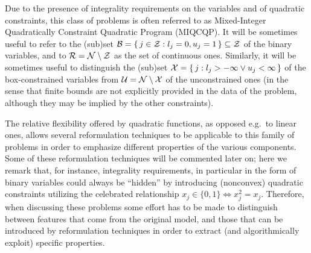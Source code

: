 %
Due to the presence of integrality requirements on the variables and of quadratic constraints, this class of problems is often referred to as Mixed-Integer Quadratically Constraint Quadratic Program (MIQCQP). It will be sometimes useful to refer to the (sub)set $\mathcal{B} =  \{ \, j \in \mathcal{Z} : l_j = 0 , u_j = 1 \, \} \subseteq \mathcal{Z}$ of the binary variables, and to $\mathcal{R} = \mathcal{N} \setminus \mathcal{Z}$ as the set of continuous ones. Similarly, it will be sometimes useful to distinguish the (sub)set $\mathcal{X} = \{ \, j : l_j > -\infty \lor u_j < \infty \, \}$ of the box-constrained variables from $\mathcal{U} = \mathcal{N} \setminus \mathcal{X}$ of the unconstrained ones (in the sense that finite bounds are not explicitly provided in the data of the problem, although they may be implied by the other constraints).

The relative flexibility offered by quadratic functions, as opposed e.g.~to linear ones, allows several reformulation techniques to be applicable to this family of problems in order to emphasize different properties of the various components. Some of these reformulation techniques will be commented later on; here we remark that, for instance, integrality requirements, in particular in the form of binary variables could always be ``hidden'' by introducing (nonconvex) quadratic constraints utilizing the celebrated relationship $x_j \in \{0, 1\} \iff x_j^2 = x_j$. Therefore, when discussing these problems some effort has to be made to distinguish between features that come from the original model, and those that can be introduced by reformulation techniques in order to extract (and algorithmically exploit) specific properties.

